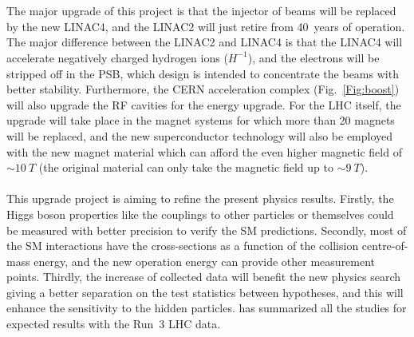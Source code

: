 \noindent
\\
\\The major upgrade of this project is that the injector of beams will be replaced by the new LINAC4, and the LINAC2 will just retire from 40~years of operation. The major difference between the LINAC2 and LINAC4 is that the LINAC4 will accelerate negatively charged hydrogen ions ($H^{-1}$), and the electrons will be stripped off in the PSB, which design is intended to concentrate the beams with better stability\cite{LINAC4}. Furthermore, the CERN acceleration complex (Fig.~\ref{Fig:boost}) will also upgrade the RF cavities for the energy upgrade. For the LHC itself, the upgrade will take place in the magnet systems for which more than 20 magnets will be replaced, and the new superconductor technology will also be employed with the new magnet material which can afford the even higher magnetic field of $\sim 10~T$ (the original material can only take the magnetic field up to $\sim 9~T$)\cite{LINAC4}. 
\\
\\This upgrade project is aiming to refine the present physics results. Firstly, the Higgs boson properties like the couplings to other particles or themselves could be measured with better precision to verify the SM predictions. Secondly, most of the SM interactions have the cross-sections as a function of the collision centre-of-mass energy, and the new operation energy can provide other measurement points. Thirdly, the increase of collected data will benefit the new physics search giving a better separation on the test statistics between hypotheses, and this will enhance the sensitivity to the hidden particles. \cite{Atlas:2019qfx} has summarized all the studies for expected results with the Run~3 LHC data.
